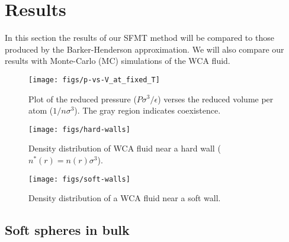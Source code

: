 \documentclass[letterpaper,twocolumn,amsmath,amssymb,prb]{revtex4-1}
\begin{document}
\section{Results}
In this section the results of our SFMT method will be compared to those 
produced by the Barker-Henderson approximation.
We will also compare our results with Monte-Carlo (MC) simulations of the WCA fluid. %

\begin{figure}
 \begin{center}
  \texttt{[image: figs/p-vs-V\_at\_fixed\_T]}
 \end{center}
\caption{Plot of the reduced pressure ($P\sigma^3/\epsilon$) verses the reduced volume per atom ($1/n\sigma^3$). The gray region indicates coexistence.}
\label{fig:p-vs-V_at_fixed_T}
\end{figure}

\begin{figure}
\begin{center}
  \texttt{[image: figs/hard-walls]}
\end{center}
\caption{Density distribution of WCA fluid near a hard wall ($n^*(r)=n(r)\sigma^3$).}
\label{fig:hard-walls}
\end{figure}

\begin{figure}
  \centering
  \texttt{[image: figs/soft-walls]}
  \caption{Density distribution of a WCA fluid near a soft wall.}
  \label{fig:soft-walls}
\end{figure}


\subsection{Soft spheres in bulk}
\end{document}
